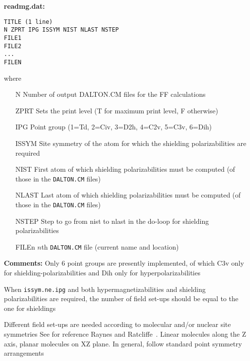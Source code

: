 \smallskip
\noindent
{\bf readmg.dat:}

\begin{verbatim}
TITLE (1 line)
N ZPRT IPG ISSYM NIST NLAST NSTEP
FILE1
FILE2
...
FILEN
\end{verbatim}
where
\begin{itemize}
\item[N] Number of output DALTON.CM files for the FF calculations
\item[ZPRT]  Sets the print level (T for maximum print level, F otherwise)
\item[IPG] Point group (1=Td, 2=Civ, 3=D2h, 4=C2v, 5=C3v, 6=Dih)
\item[ISSYM] Site symmetry of the atom for which the shielding
               polarizabilities are required
\item[NIST] First atom of which shielding polarizabilities must be computed
               (of those in  the \verb|DALTON.CM| files)
\item[NLAST] Last atom of which shielding polarizabilities must be computed
               (of those in  the \verb|DALTON.CM| files)
\item[NSTEP] Step to go from nist to nlast in the do-loop for
               shielding polarizabilities
\item[FILEn] $n$th \verb|DALTON.CM| file (current name and location)
\end{itemize}

\smallskip
\noindent
{\bf Comments:}
    Only 6 point groups are presently implemented, of which
    C3v only for shielding-polarizabilities and
    Dih only for hyperpolarizabilities

    When \verb|issym.ne.ipg| and both
    hypermagnetizabilities
    and shielding
    polarizabilities are required, the number of field set-ups should
    be equal to the one for shieldings

    Different field set-ups are needed according to
    molecular  and/or nuclear site symmetries
    See for reference Raynes and Ratcliffe~\cite{wtrrrmp37}.
    Linear molecules along the Z axis, planar molecules
    on XZ plane. In general, follow standard point
    symmetry arrangements

